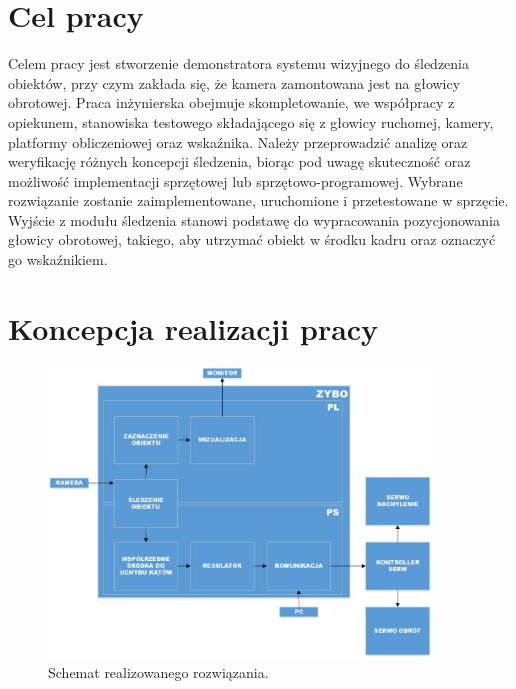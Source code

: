 
\section{Cel pracy}
\label{sec:celpracy}

Celem pracy jest stworzenie demonstratora systemu wizyjnego do śledzenia obiektów, przy czym zakłada się, że kamera zamontowana jest na głowicy obrotowej. Praca inżynierska obejmuje skompletowanie, we współpracy z opiekunem, stanowiska testowego składającego się z głowicy ruchomej, kamery, platformy obliczeniowej oraz wskaźnika. Należy przeprowadzić analizę oraz weryfikację różnych koncepcji śledzenia, biorąc pod uwagę skuteczność oraz możliwość implementacji sprzętowej lub sprzętowo-programowej. Wybrane rozwiązanie zostanie zaimplementowane, uruchomione i przetestowane w sprzęcie. Wyjście z modułu śledzenia stanowi podstawę do wypracowania pozycjonowania głowicy obrotowej, takiego, aby utrzymać obiekt w środku kadru oraz oznaczyć go wskaźnikiem.


\section{Koncepcja realizacji pracy}
\label{sec:koncepcjarealizacjipracy}

\begin{figure}[h]
	\centering
	\includegraphics[width=4in]{scheme_pol.jpg}
	\caption{Schemat realizowanego rozwiązania.}
	\label{fig:schemat}
\end{figure}

